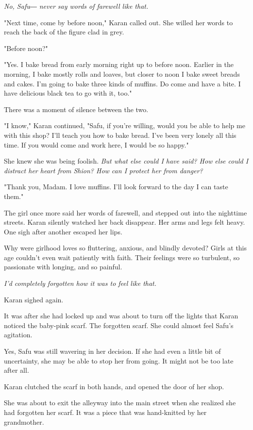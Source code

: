 \emph{No, Safu― never say words of farewell like that.}

"Next time, come by before noon," Karan called out. She willed her words
to reach the back of the figure clad in grey.

"Before noon?"

"Yes. I bake bread from early morning right up to before noon. Earlier
in the morning, I bake mostly rolls and loaves, but closer to noon I
bake sweet breads and cakes. I'm going to bake three kinds of muffins.
Do come and have a bite. I have delicious black tea to go with it, too."

There was a moment of silence between the two.

"I know," Karan continued, "Safu, if you're willing, would you be able
to help me with this shop? I'll teach you how to bake bread. I've been
very lonely all this time. If you would come and work here, I would be
so happy."

She knew she was being foolish. \emph{But what else could I have said? How
	else could I distract her heart from Shion? How can I protect her from
	danger?}

"Thank you, Madam. I love muffins. I'll look forward to the day I can
taste them."

The girl once more said her words of farewell, and stepped out into the
nighttime streets. Karan silently watched her back disappear. Her arms
and legs felt heavy. One sigh after another escaped her lips.

Why were girlhood loves so fluttering, anxious, and blindly devoted?
Girls at this age couldn't even wait patiently with faith. Their
feelings were so turbulent, so passionate with longing, and so painful.

\emph{I'd completely forgotten how it was to feel like that.}

Karan sighed again.

It was after she had locked up and was about to turn off the lights that
Karan noticed the baby-pink scarf. The forgotten scarf. She could almost
feel Safu's agitation.

Yes, Safu was still wavering in her decision. If she had even a little
bit of uncertainty, she may be able to stop her from going. It might not
be too late after all.

Karan clutched the scarf in both hands, and opened the door of her shop.

\myspace

She was about to exit the alleyway into the main street when she
realized she had forgotten her scarf. It was a piece that was
hand-knitted by her grandmother.

